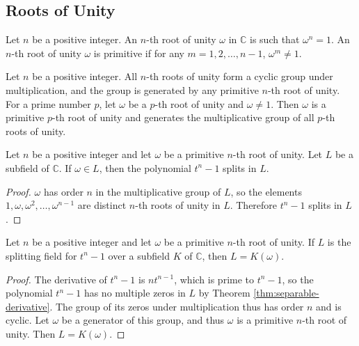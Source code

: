 \subsection{Roots of Unity}


\begin{definition}
	Let $n$ be a positive integer. An $n$-th root of unity $\omega$ in $\mathbb C$ is such that $\omega ^ n = 1$. An $n$-th root of unity $\omega$ is primitive if for any $m = 1, 2, \dots, n - 1$, $\omega ^ m \neq 1$.
\end{definition}

\begin{observation}
	Let $n$ be a positive integer. All $n$-th roots of unity form a cyclic group under multiplication, and the group is generated by any primitive $n$-th root of unity. For a prime number $p$, let $\omega$ be a $p$-th root of unity and $\omega \neq 1$. Then $\omega$ is a primitive $p$-th root of unity and generates the multiplicative group of all $p$-th roots of unity.
\end{observation}

\begin{theorem} \label{thm:unity-1}
	Let $n$ be a positive integer and let $\omega$ be a primitive $n$-th root of unity. Let $L$ be a subfield of $\mathbb C$. If $\omega \in L$, then the polynomial $t^n - 1$ splits in $L$.
\end{theorem}
\begin{proof}
	$\omega$ has order $n$ in the multiplicative group of $L$, so the elements $1, \omega, \omega^2, \ldots, \omega^{n-1}$ are distinct $n$-th roots of unity in $L$. Therefore $t^n-1$ splits in $L$.
\end{proof}

\begin{theorem} \label{thm:unity-2}
	Let $n$ be a positive integer and let $\omega$ be a primitive $n$-th root of unity. If $L$ is the splitting field for $t^n - 1$ over a subfield $K$ of $\mathbb C$, then $L = K(\omega)$.
\end{theorem}

\begin{proof}
	The derivative of $t^n-1$ is $n t^{n-1}$, which is prime to $t^n-1$, so the polynomial $t^n-1$ has no multiple zeros in $L$ by Theorem \ref{thm:separable-derivative}. The group of its zeros under multiplication thus has order $n$ and is cyclic. Let $\omega$ be a generator of this group, and thus $\omega$ is a primitive $n$-th root of unity. Then $L=K(\omega)$. 
\end{proof}




